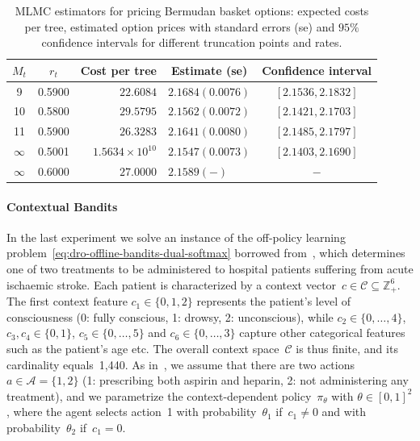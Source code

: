 \documentclass[11pt]{article}
\begin{document}
\begin{table}[htb]
\centering
\begin{tabular}{crrlc}
\hline
$M_t$    & \multicolumn{1}{c}{$r_t$} & \multicolumn{1}{c}{Cost per tree} & \multicolumn{1}{c}{Estimate (se)} & Confidence interval                 \\ \hline
9        & 0.5900                    & $22.6084 $               & $2.1684 (0.0076)$                 & $[2.1536, 2.1832]$ \\
10       & 0.5800                    & $29.5795$                & $2.1562 (0.0072)$                 & $[2.1421, 2.1703]$ \\
11       & 0.5900                    & $26.3283$                & $2.1641 (0.0080)$                 & $[2.1485, 2.1797]$ \\
$\infty$ & 0.5001                    & $1.5634 \times 10^{10}$  & $2.1547 (0.0073)$                         & $[2.1403, 2.1690]$ \\
$\infty$ & 0.6000                    & $27.0000$                & $2.1589 (-)$                      & $-$        
        \\ \hline
\end{tabular}
\caption{MLMC estimators for pricing Bermudan basket options: expected costs per tree, estimated option prices with standard errors (se) and $95\%$ confidence intervals for different truncation points and rates.}
\label{tab:option}
\end{table}

\paragraph{Contextual Bandits} 

In the last experiment we solve an instance of the off-policy learning problem~\eqref{eq:dro-offline-bandits-dual-softmax} borrowed from~\citep{shen2024wasserstein}, which determines one of two treatments to be administered to hospital patients suffering from acute ischaemic stroke. Each patient is characterized by a context vector~$c \in \mathcal{C} \subseteq \mathbb{Z}_+^6$. The first context feature $c_1 \in \{0,1,2\}$ represents the patient's level of consciousness (0: fully conscious, 1: drowsy, 2: unconscious), while $c_2 \in \{0, \dots, 4\}$, $c_3, c_4 \in \{0, 1\}$,  $c_5 \in \{0, \dots, 5\}$ and $c_6 \in \{0, \dots, 3\}$ capture other categorical features such as the patient's age etc. The overall context space~$\mathcal{C}$ is thus finite, and its cardinality equals~1{,}440. As in~\citep{shen2024wasserstein}, we assume that there are two actions $a\in\mathcal A=\{1,2\}$ (1: prescribing both aspirin and heparin, 2: not administering any treatment), and we parametrize the context-dependent policy~$\pi_\theta$ with $\theta \in[0,1]^2$, where the agent selects action~1 with probability~$\theta_1$ if~$c_1 \neq 0$ and with probability~$\theta_2$ if~$c_1 = 0$. 
\end{document}
